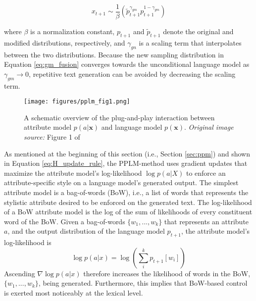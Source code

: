 \begin{equation}
    x_{t + 1} \sim \frac{1}{\beta}
    \left( 
    \tilde{p}_{t + 1}^{\gamma_{gm}} p_{t + 1}^{1 - \gamma_{gm}}
    \right)
    \label{eq:gm_fusion}
\end{equation}

where $\beta$ is a normalization constant, $p_{t + 1}$ and $\tilde{p}_{t + 1}$ denote the original and modified distributions, respectively, and $\gamma_{gn}$ is a scaling term that interpolates between the two distributions. Because the new sampling distribution in Equation \ref{eq:gm_fusion} converges towards the unconditional language model as $\gamma_{gm} \rightarrow 0$, repetitive text generation can be avoided by decreasing the scaling term.


\begin{figure}[H]
    \centering
    \texttt{[image: figures/pplm\_fig1.png]}
    \caption{A schematic overview of the plug-and-play interaction between attribute model $p(a | \textbf{x})$ and language model $p(\textbf{x})$. \textit{Original image source:} Figure 1 of \cite{dathathri2019plug}}
    \label{fig:pplm_schematic_overview}
\end{figure}


As mentioned at the beginning of this section (i.e., Section \ref{sec:ppm}) and shown in Equation \ref{eq:H_update_rule}, the PPLM-method uses gradient updates that maximize the attribute model's log-likelihood $\log p(a | X)$ to enforce an attribute-specific style on a language model's generated output.
The simplest attribute model is a bag-of-words (BoW), i.e., a list of words that represents the stylistic attribute desired to be enforced on the generated text.
The log-likelihood of a BoW attribute model is the log of the sum of likelihoods of every constituent word of the BoW.
Given a bag-of-words $\{w_1, ..., w_k\}$ that represents an attribute $a$, and the output distribution of the language model $p_{t + 1}$, the attribute model's log-likelihood is
\begin{equation}
    \log p(a | x) = \log \left( \sum_{i}^{k} p_{t + 1} [w_i] \right)
    \label{eq:bow_att_model_loglikelihood}
\end{equation}
Ascending $\nabla \log p(a | x)$ therefore increases the likelihood of words in the BoW, $\{w_1, ..., w_k\}$, being generated. Furthermore, this implies that BoW-based control is exerted most noticeably at the lexical level.

